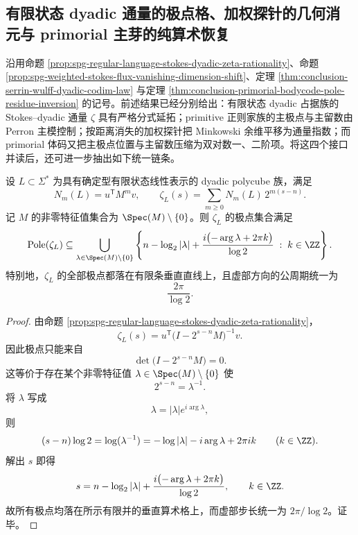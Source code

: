 \subsection{有限状态 dyadic 通量的极点格、加权探针的几何消元与 primorial 主芽的纯算术恢复}\label{subsec:conclusion-dyadic-flux-polegrid-weighted-probe-primorial-germ}
沿用命题 \ref{prop:spg-regular-language-stokes-dyadic-zeta-rationality}、命题 \ref{prop:spg-weighted-stokes-flux-vanishing-dimension-shift}、定理 \ref{thm:conclusion-serrin-wulff-dyadic-codim-law} 与定理 \ref{thm:conclusion-primorial-bodycode-pole-residue-inversion} 的记号。前述结果已经分别给出：有限状态 dyadic 占据族的 Stokes--dyadic 通量 \(\zeta\) 具有严格分式延拓；primitive 正则家族的主极点与主留数由 Perron 主模控制；按距离消失的加权探针把 Minkowski 余维平移为通量指数；而 primorial 体码又把主极点位置与主留数压缩为双对数一、二阶项。将这四个接口并读后，还可进一步抽出如下统一链条。

\begin{theorem}\label{thm:conclusion-dyadic-flux-finite-state-vertical-pole-grids}
设 \(L\subset \Sigma^\ast\) 为具有确定型有限状态线性表示的 dyadic polycube 族，满足
\[
N_m(L)=u^{\mathsf T}M^m v,
\qquad
\zeta_L(s)=\sum_{m\ge 0}N_m(L)\,2^{m(s-n)}.
\]
记 \(M\) 的非零特征值集合为 \(\Spec(M)\setminus\{0\}\)。则 \(\zeta_L\) 的极点集合满足
\[
\operatorname{Pole}(\zeta_L)\subseteq
\bigcup_{\lambda\in\Spec(M)\setminus\{0\}}
\left\{
n-\log_2|\lambda|
+\frac{i\bigl(-\arg\lambda+2\pi k\bigr)}{\log 2}
\;:\;k\in\ZZ
\right\}.
\]
特别地，\(\zeta_L\) 的全部极点都落在有限条垂直直线上，且虚部方向的公周期统一为
\[
\frac{2\pi}{\log 2}.
\]
\end{theorem}
\begin{proof}
由命题 \ref{prop:spg-regular-language-stokes-dyadic-zeta-rationality}，
\[
\zeta_L(s)=u^{\mathsf T}\bigl(I-2^{s-n}M\bigr)^{-1}v.
\]
因此极点只能来自
\[
\det\!\bigl(I-2^{s-n}M\bigr)=0.
\]
这等价于存在某个非零特征值 \(\lambda\in\Spec(M)\setminus\{0\}\) 使
\[
2^{s-n}=\lambda^{-1}.
\]
将 \(\lambda\) 写成
\[
\lambda=|\lambda|e^{i\arg\lambda},
\]
则
\[
(s-n)\log 2
=
\log(\lambda^{-1})
=
-\log|\lambda|-i\arg\lambda+2\pi i k
\qquad(k\in\ZZ).
\]
解出 \(s\) 即得
\[
s
=
n-\log_2|\lambda|
+\frac{i\bigl(-\arg\lambda+2\pi k\bigr)}{\log 2},
\qquad
k\in\ZZ.
\]
故所有极点均落在所示有限并的垂直算术格上，而虚部步长统一为 \(2\pi/\log 2\)。证毕。
\end{proof}

